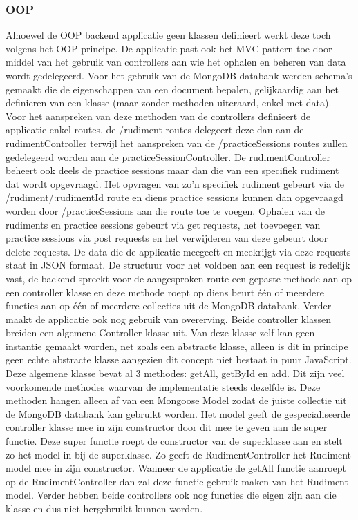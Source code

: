 \subsubsection{OOP}
Alhoewel de OOP backend applicatie geen klassen definieert werkt deze toch volgens het OOP principe. De applicatie past ook het MVC pattern toe door middel van het gebruik van controllers aan wie het ophalen en beheren van data wordt gedelegeerd. Voor het gebruik van de MongoDB databank werden schema's gemaakt die de eigenschappen van een document bepalen, gelijkaardig aan het definieren van een klasse (maar zonder methoden uiteraard, enkel met data). Voor het aanspreken van deze methoden van de controllers definieert de applicatie enkel routes, de /rudiment routes delegeert deze dan aan de rudimentController terwijl het aanspreken van de /practiceSessions routes zullen gedelegeerd worden aan de practiceSessionController. De rudimentController beheert ook deels de practice sessions maar dan die van een specifiek rudiment dat wordt opgevraagd. Het opvragen van zo'n specifiek rudiment gebeurt via de /rudiment/:rudimentId route en diens practice sessions kunnen dan opgevraagd worden door /practiceSessions aan die route toe te voegen. Ophalen van de rudiments en practice sessions gebeurt via get requests, het toevoegen van practice sessions via post requests en het verwijderen van deze gebeurt door delete requests. De data die de applicatie meegeeft en meekrijgt via deze requests staat in JSON formaat. De structuur voor het voldoen aan een request is redelijk vast, de backend spreekt voor de aangesproken route een gepaste methode aan op een controller klasse en deze methode roept op diens beurt één of meerdere functies aan op één of meerdere collecties uit de MongoDB databank. Verder maakt de applicatie ook nog gebruik van overerving. Beide controller klassen breiden een algemene Controller klasse uit. Van deze klasse zelf kan geen instantie gemaakt worden, net zoals een abstracte klasse, alleen is dit in principe geen echte abstracte klasse aangezien dit concept niet bestaat in puur JavaScript. Deze algemene klasse bevat al 3 methodes: getAll, getById en add. Dit zijn veel voorkomende methodes waarvan de implementatie steeds dezelfde is. Deze methoden hangen alleen af van een Mongoose Model zodat de juiste collectie uit de MongoDB databank kan gebruikt worden. Het model geeft de gespecialiseerde controller klasse mee in zijn constructor door dit mee te geven aan de super functie. Deze super functie roept de constructor van de superklasse aan en stelt zo het model in bij de superklasse. Zo geeft de RudimentController het Rudiment model mee in zijn constructor. Wanneer de applicatie de getAll functie aanroept op de RudimentController dan zal deze functie gebruik maken van het Rudiment model. Verder hebben beide controllers ook nog functies die eigen zijn aan die klasse en dus niet hergebruikt kunnen worden.

